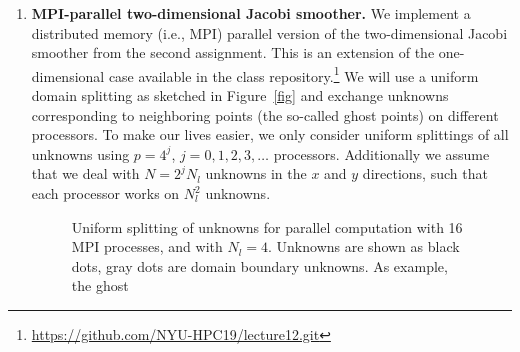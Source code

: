 \documentclass[12pt]{article}
\begin{document}
\begin{enumerate}
\item {\bf MPI-parallel two-dimensional Jacobi smoother.} We implement
  a distributed memory (i.e., MPI) parallel version of the
  two-dimensional Jacobi smoother from the second assignment. This is
  an extension of the one-dimensional case available in the class
  repository.\footnote{\url{https://github.com/NYU-HPC19/lecture12.git}}
  We will use a uniform domain splitting as sketched in
  Figure~\ref{fig} and exchange unknowns corresponding to neighboring
  points (the so-called ghost points) on different processors. To make our lives easier, we only
  consider uniform splittings of all unknowns using $p=4^j$,
  $j=0,1,2,3,\ldots$ processors. Additionally we assume that we deal
  with $N=2^jN_l$ unknowns in the $x$ and $y$ directions, such that
  each processor works on $N_l^2$ unknowns.
  \begin{figure}[bht]\centering
   \hspace{5ex}
\caption{Uniform splitting of unknowns for parallel computation with
  16 MPI processes, and with $N_l=4$. Unknowns are shown as black
  dots, gray dots are domain boundary unknowns. As example, the ghost
}
\end{figure}
\end{enumerate}
\end{document}
